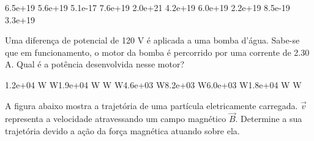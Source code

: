 \documentclass[12pt, addpoints]{exam}
\begin{document}
\begin{questions}
\begin{multicols*}{2}
\begin{oneparchoices}
\choice 6.5e+19 \choice 5.6e+19 \choice 5.1e-17 \choice 7.6e+19 \choice 2.0e+21 \choice 4.2e+19 \choice 6.0e+19 \choice 2.2e+19 \choice 8.5e-19 \choice 3.3e+19 
\end{oneparchoices}\question Uma diferença de potencial de 120 V é aplicada a uma bomba d’água. Sabe-se que em funcionamento, o motor da bomba é percorrido por uma corrente de    2.30 A. Qual é a potência desenvolvida nesse motor?

\begin{oneparchoices}
\choice 1.2e+04 W W\choice 1.9e+04 W W W\choice 4.6e+03 W\choice 8.2e+03 W\choice 6.0e+03 W\choice 1.8e+04 W W
\end{oneparchoices}\question A ﬁgura abaixo mostra a trajetória de uma partícula eletricamente carregada. $\vec{{v}}$ representa a velocidade atravessando um campo magnético $\vec{{B}}$. Determine a sua trajetória devido a ação da força magnética atuando sobre ela.
        
        \begin{center}
            \begin{minipage}[c]{0.5\linewidth}
            \end{minipage}
        \end{center}

        


\end{multicols*}
\end{questions}
\end{document}
